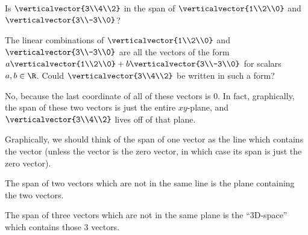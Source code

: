 \documentclass{ximera}
\begin{document}
\begin{question}
  Is $\verticalvector{3\\4\\2}$ in the span of $\verticalvector{1\\2\\0}$ and $\verticalvector{3\\-3\\0}$?
  \begin{solution}
    \begin{hint}
      The linear combinations of $\verticalvector{1\\2\\0}$ and $\verticalvector{3\\-3\\0}$ are all the vectors of the form
      $a\verticalvector{1\\2\\0} + b\verticalvector{3\\-3\\0}$ for scalars $a,b\in \R$.  Could $\verticalvector{3\\4\\2}$ be written in such a form?
    \end{hint}
    \begin{hint}
      No, because the last coordinate of all of these vectors is $0$.  In fact, graphically, the span of these two vectors is just the entire $xy$-plane, 
      and $\verticalvector{3\\4\\2}$ lives off of that plane.
    \end{hint}
    \begin{multiple-choice}
    \end{multiple-choice}
  \end{solution}
\end{question}

Graphically, we should think of the span of one vector as the line
which contains the vector (unless the vector is the zero vector, in
which case its span is just the zero vector).
  
The span of two vectors which are not in the same line is the plane
containing the two vectors.

The span of three vectors which are not in the same plane is the
``$3$D-space'' which contains those $3$ vectors.
  	 	 
\end{document}
